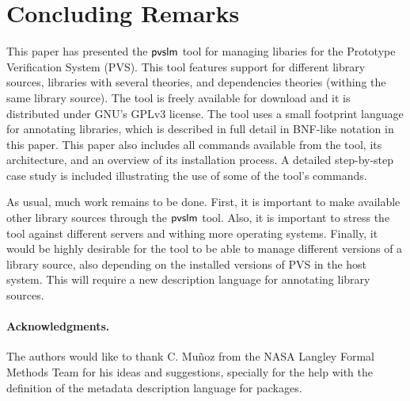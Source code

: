 \section{Concluding Remarks}
\label{sec.concl}

This paper has presented the $\textsf{pvslm}$ tool for managing libaries for
the Prototype Verification System (PVS). This tool features support
for different library sources, libraries with several theories, and
dependencies theories (withing the same library source).  The tool is
freely available for download and it is distributed under GNU's GPLv3
license. The tool uses a small footprint language for annotating
libraries, which is described in full detail in BNF-like notation in
this paper. This paper also includes all commands available from the
tool, its architecture, and an overview of its installation process.
A detailed step-by-step case study is included illustrating the use of
some of the tool's commands.

As usual, much work remains to be done. First, it is important to make
available other library sources through the $\textsf{pvslm}$ tool.  Also, it
is important to stress the tool against different servers and withing
more operating systems. Finally, it would be highly desirable for the
tool to be able to manage different versions of a library source, also
depending on the installed versions of PVS in the host system. This
will require a new description language for annotating library
sources.

\paragraph{\bf Acknowledgments.} The authors would like to thank
C. Mu\~noz from the NASA Langley Formal Methods Team for his ideas and
suggestions, specially for the help with the definition of the
metadata description language for packages.
